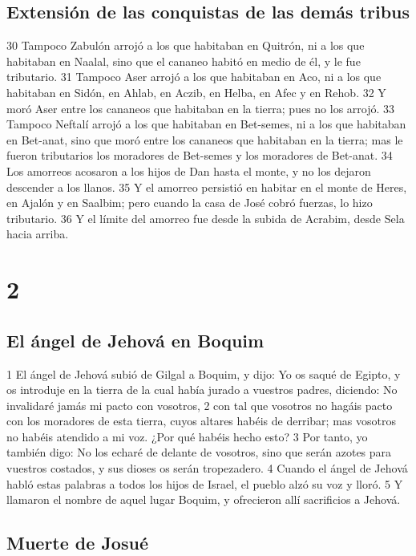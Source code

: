 \section*{Extensión de las conquistas de las demás tribus}

30 Tampoco Zabulón arrojó a los que habitaban en Quitrón, ni a los que habitaban en Naalal, sino que el cananeo habitó en medio de él, y le fue tributario.
31 Tampoco Aser arrojó a los que habitaban en Aco, ni a los que habitaban en Sidón, en Ahlab, en Aczib, en Helba, en Afec y en Rehob.
32 Y moró Aser entre los cananeos que habitaban en la tierra; pues no los arrojó.
33 Tampoco Neftalí arrojó a los que habitaban en Bet-semes, ni a los que habitaban en Bet-anat, sino que moró entre los cananeos que habitaban en la tierra; mas le fueron tributarios los moradores de Bet-semes y los moradores de Bet-anat. 
34 Los amorreos acosaron a los hijos de Dan hasta el monte, y no los dejaron descender a los llanos.
35 Y el amorreo persistió en habitar en el monte de Heres, en Ajalón y en Saalbim; pero cuando la casa de José cobró fuerzas, lo hizo tributario.
36 Y el límite del amorreo fue desde la subida de Acrabim, desde Sela hacia arriba.

\chapter{2}

\section*{El ángel de Jehová en Boquim}


1 El ángel de Jehová subió de Gilgal a Boquim, y dijo: Yo os saqué de Egipto, y os introduje en la tierra de la cual había jurado a vuestros padres, diciendo: No invalidaré jamás mi pacto con vosotros,
2 con tal que vosotros no hagáis pacto con los moradores de esta tierra, cuyos altares habéis de derribar; mas vosotros no habéis atendido a mi voz. ¿Por qué habéis hecho esto?
3 Por tanto, yo también digo: No los echaré de delante de vosotros, sino que serán azotes para vuestros costados, y sus dioses os serán tropezadero.
4 Cuando el ángel de Jehová habló estas palabras a todos los hijos de Israel, el pueblo alzó su voz y lloró.
5 Y llamaron el nombre de aquel lugar Boquim, y ofrecieron allí sacrificios a Jehová.
\section*{Muerte de Josué }


